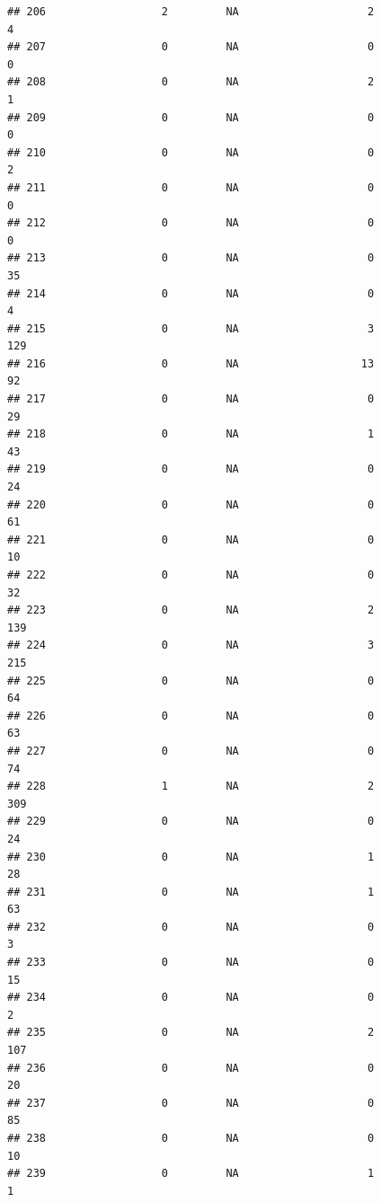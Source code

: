 \documentclass[
]{article}
\begin{document}
\begin{verbatim}
## 206                  2         NA                    2                  4
## 207                  0         NA                    0                  0
## 208                  0         NA                    2                  1
## 209                  0         NA                    0                  0
## 210                  0         NA                    0                  2
## 211                  0         NA                    0                  0
## 212                  0         NA                    0                  0
## 213                  0         NA                    0                 35
## 214                  0         NA                    0                  4
## 215                  0         NA                    3                129
## 216                  0         NA                   13                 92
## 217                  0         NA                    0                 29
## 218                  0         NA                    1                 43
## 219                  0         NA                    0                 24
## 220                  0         NA                    0                 61
## 221                  0         NA                    0                 10
## 222                  0         NA                    0                 32
## 223                  0         NA                    2                139
## 224                  0         NA                    3                215
## 225                  0         NA                    0                 64
## 226                  0         NA                    0                 63
## 227                  0         NA                    0                 74
## 228                  1         NA                    2                309
## 229                  0         NA                    0                 24
## 230                  0         NA                    1                 28
## 231                  0         NA                    1                 63
## 232                  0         NA                    0                  3
## 233                  0         NA                    0                 15
## 234                  0         NA                    0                  2
## 235                  0         NA                    2                107
## 236                  0         NA                    0                 20
## 237                  0         NA                    0                 85
## 238                  0         NA                    0                 10
## 239                  0         NA                    1                  1

\end{verbatim}
\end{document}
